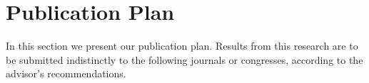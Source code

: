 \documentclass[11pt]{article}   %
\begin{document}
% 
%	  	
\section{Publication Plan}\label{PubPlan}
  In this section we present our publication plan. Results from this research are to be submitted indistinctly 
  to the following journals or congresses, according to the advisor’s recommendations.
  
\end{document}
